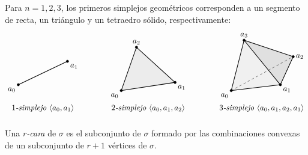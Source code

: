 \begin{ejemplo}
Para $n = 1, 2, 3$, los primeros simplejos geométricos corresponden a un segmento de recta, un triángulo y un tetraedro sólido, respectivamente:
\[
\begin{tikzpicture}[scale=1.05]
    \begin{scope}[shift={(0, 0)}]
        \coordinate (A0) at (0, 0.35);
        \coordinate (A1) at (2.1, 1.35);

        \draw[thick] (A0) -- (A1);
        \filldraw (A0) circle (1.5pt) node[below left] {$a_0$};
        \filldraw (A1) circle (1.5pt) node[below right] {$a_1$};

        \node at (1.05, -0.65) {\textit{$1$-simplejo} $\langle a_0, a_1 \rangle$};
    \end{scope}

    \begin{scope}[shift={(4.4, 0)}]
        \coordinate (B0) at (0, 0.1);
        \coordinate (B1) at (2.3, 0.45);
        \coordinate (B2) at (0.65, 1.95);

        \fill[gray!15] (B0) -- (B1) -- (B2) -- cycle;
        \draw[thick] (B0) -- (B1) -- (B2) -- cycle;

        \filldraw (B0) circle (1.5pt) node[below left] {$a_0$};
        \filldraw (B1) circle (1.5pt) node[below right] {$a_1$};
        \filldraw (B2) circle (1.5pt) node[above] {$a_2$};

        \node at (1.15, -0.65) {\textit{$2$-simplejo} $\langle a_0, a_1, a_2 \rangle$};
    \end{scope}

    \begin{scope}[shift={(9.1, 0)}]
        \coordinate (C0) at (0, 0.1);
        \coordinate (C1) at (2.1, 0.35);
        \coordinate (C2) at (2.65, 1.55);
        \coordinate (C3) at (0.55, 2.25);

        \fill[gray!12] (C0) -- (C1) -- (C3) -- cycle;
        \fill[gray!24] (C1) -- (C2) -- (C3) -- cycle;

        \draw[dashed, thin] (C0) -- (C2);

        \draw[thick] (C0) -- (C1) -- (C2) -- (C3) -- cycle;
        \draw[thick] (C1) -- (C3);

        \filldraw (C0) circle (1.5pt) node[below left] {$a_0$};
        \filldraw (C1) circle (1.5pt) node[below right] {$a_1$};
        \filldraw (C2) circle (1.5pt) node[right] {$a_2$};
        \filldraw (C3) circle (1.5pt) node[above] {$a_3$};

        \node at (1.3, -0.65) {\textit{$3$-simplejo} $\langle a_0, a_1, a_2, a_3 \rangle$};
    \end{scope}
\end{tikzpicture}
\]
\end{ejemplo}
\begin{definicion}
Una \textit{$r$-cara} de $\sigma$ es el subconjunto de $\sigma$ formado por las combinaciones convexas de un subconjunto de $r + 1$ vértices de $\sigma$.
\end{definicion}

